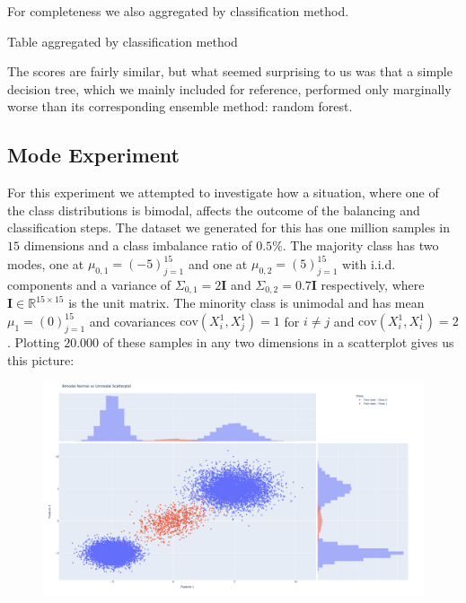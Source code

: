 For completeness we also aggregated by classification method.

\begin{table}[H]
\centering
\caption{Table aggregated by classification method}
\end{table}

The scores are fairly similar, but what seemed surprising to us was that a simple decision tree, which we mainly included for reference, 
performed only marginally worse than its corresponding ensemble method: random forest.


\subsection{Mode Experiment}

For this experiment we attempted to investigate how a situation, where one of the class distributions is bimodal, affects the outcome of the balancing and classification steps.
The dataset we generated for this has one million samples in $15$ dimensions and a class imbalance ratio of $0.5\%$. 
The majority class has two modes, one at $\mu_{0,1} = (-5)_{j=1}^{15}$ and one at $\mu_{0,2} = (5)_{j=1}^{15}$ with i.i.d. components 
and a variance of $\Sigma_{0,1} = 2 \mathbf{I}$ and $\Sigma_{0,2} = 0.7 \mathbf{I}$ respectively, where $\mathbf{I} \in \mathbb{R}^{15 \times 15}$ is the unit matrix.
The minority class is unimodal and has mean $\mu_{1} = (0)_{j=1}^{15}$ and covariances $\text{cov}(X_i^1, X_j^1) = 1$ for $i \neq j$ and $\text{cov}(X_i^1, X_i^1) = 2$.
Plotting $20.000$ of these samples in any two dimensions in a scatterplot gives us this picture:

\begin{figure}[H]
  	\centering
  	\includegraphics[width=\linewidth]{assets/data_vis/Bimodal_Maj_Unimodal_Min.png}
  	\label{fig:Mode_Experiment}
\end{figure}

